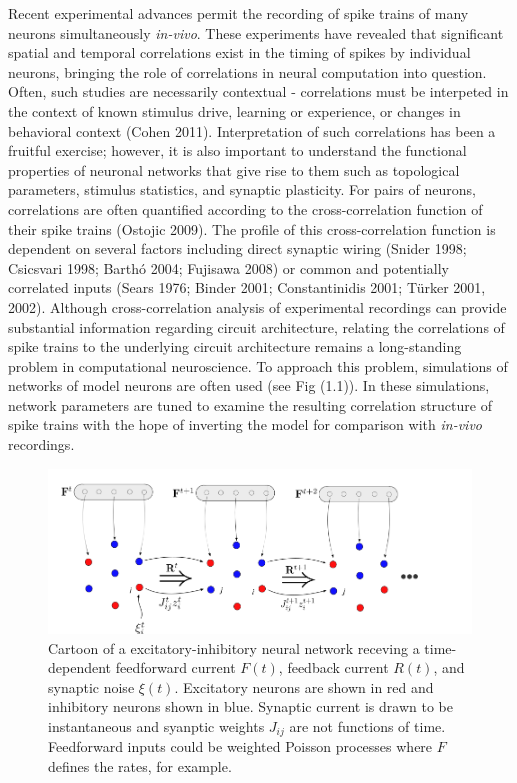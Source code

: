 \documentclass{ucetd}
\begin{document}
Recent experimental advances permit the recording of spike trains of many neurons simultaneously \emph{in-vivo}. These experiments have revealed that significant spatial and temporal correlations exist in the timing of spikes by individual neurons, bringing the role of correlations in neural computation into question. Often, such studies are necessarily contextual - correlations must be interpeted in the context of known stimulus drive, learning or experience, or changes in behavioral context (Cohen 2011). Interpretation of such correlations has been a fruitful exercise; however, it is also important to understand the functional properties of neuronal networks that give rise to them such as topological parameters, stimulus statistics, and synaptic plasticity. For pairs of neurons, correlations are often quantified according to the cross-correlation function of their spike trains (Ostojic 2009). The profile of this cross-correlation function is dependent on several factors including direct synaptic wiring (Snider 1998; Csicsvari 1998; Barthó 2004; Fujisawa 2008) or common and potentially correlated inputs (Sears 1976; Binder 2001; Constantinidis 2001; Türker 2001, 2002). Although cross-correlation analysis of experimental recordings can provide substantial information regarding circuit architecture, relating the correlations of spike trains to the underlying circuit architecture remains a long-standing problem in computational neuroscience. To approach this problem, simulations of networks of model neurons are often used (see Fig (1.1)). In these simulations, network parameters are tuned to examine the resulting correlation structure of spike trains with the hope of inverting the model for comparison with \emph{in-vivo} recordings. 

\begin{figure}[t!]
\centering
\includegraphics[width=175mm]{figure-1}
\caption{Cartoon of a excitatory-inhibitory neural network receving a time-dependent feedforward current $F(t)$, feedback current $R(t)$, and synaptic noise $\xi(t)$. Excitatory neurons are shown in red and inhibitory neurons shown in blue. Synaptic current is drawn to be instantaneous and syanptic weights $J_{ij}$ are not functions of time. Feedforward inputs could be weighted Poisson processes where $F$ defines the rates, for example.}
\end{figure}
\end{document}
